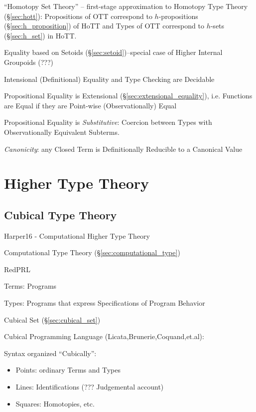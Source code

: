 ``Homotopy Set Theory'' -- first-stage approximation to Homotopy Type
Theory (\S\ref{sec:hott}): Propositions of OTT correspond to
$h$-propositions (\S\ref{sec:h_proposition}) of HoTT and Types of OTT
correspond to $h$-sets (\S\ref{sec:h_set}) in HoTT.

Equality based on Setoids (\S\ref{sec:setoid})--special case of Higher
Internal Groupoids (???)

Intensional (Definitional) Equality and Type Checking are Decidable

Propositional Equality is Extensional
(\S\ref{sec:extensional_equality}), i.e. Functions are Equal if they
are Point-wise (Observationally) Equal

Propositional Equality is \emph{Substitutive}: Coercion between Types
with Observationally Equivalent Subterms.

\emph{Canonicity}: any Closed Term is Definitionally Reducible to a
Canonical Value



\section{Higher Type Theory}\label{sec:higher_type_theory}

\subsection{Cubical Type Theory}\label{sec:cubical_type_theory}

Harper16 - Computational Higher Type Theory

\fist Computational Type Theory (\S\ref{sec:computational_type})

RedPRL

Terms: Programs

Types: Programs that express Specifications of Program Behavior

Cubical Set (\S\ref{sec:cubical_set})

Cubical Programming Language (Licata,Brunerie,Coquand,et.al):

Syntax organized ``Cubically'':
\begin{itemize}
  \item Points: ordinary Terms and Types
  \item Lines: Identifications (??? Judgemental account)
  \item Squares: Homotopies, etc.
\end{itemize}

